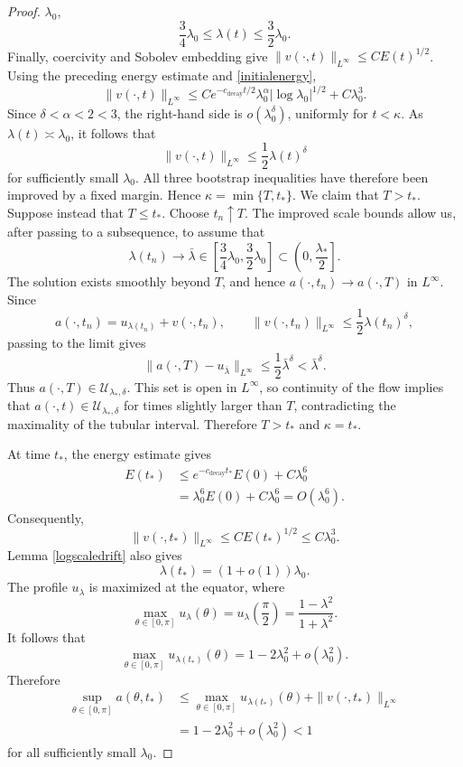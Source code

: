 \documentclass[11pt,a4paper]{article}
\numberwithin{equation}{section}
\theoremstyle{plain}
\theoremstyle{remark}
\begin{document}
\begin{proof}
$\lambda_0$,
$$
\frac34\lambda_0
\leq
\lambda(t)
\leq
\frac32\lambda_0.
$$
Finally, coercivity and Sobolev embedding give $\|v(\cdot,t)\|_{L^\infty}
\leq
CE(t)^{1/2}$. Using the preceding energy estimate and
\eqref{initialenergy},
$$
\|v(\cdot,t)\|_{L^\infty}
\leq
Ce^{-c_{\mathrm{decay}} t/2}
\lambda_0^\alpha
\left|\log\lambda_0\right|^{1/2}
+
C\lambda_0^3.
$$
Since $\delta<\alpha<2<3$, the right-hand side is
$o(\lambda_0^\delta)$, uniformly for $t<\kappa$. As
$\lambda(t)\asymp\lambda_0$, it follows that
$$
\|v(\cdot,t)\|_{L^\infty}
\leq
\frac12\lambda(t)^\delta
$$
for sufficiently small $\lambda_0$.
All three bootstrap inequalities have therefore been improved by a
fixed margin. Hence $\kappa=\min\{T,t_*\}$. We claim that $T>t_*$. Suppose instead that $T\leq t_*$. Choose
$t_n\uparrow T$. The improved scale bounds allow us, after passing
to a subsequence, to assume that
$$
\lambda(t_n)\longrightarrow\bar\lambda
\in
\left[\frac34\lambda_0,\frac32\lambda_0\right]
\subset
\left(0,\frac{\lambda_*}{2}\right].
$$
The solution exists smoothly beyond $T$, and hence
$a(\cdot,t_n)\to a(\cdot,T)$ in $L^\infty$. Since
$$
a(\cdot,t_n)
=
u_{\lambda(t_n)}+v(\cdot,t_n),
\qquad
\|v(\cdot,t_n)\|_{L^\infty}
\leq
\frac12\lambda(t_n)^\delta,
$$
passing to the limit gives
$$
\|a(\cdot,T)-u_{\bar\lambda}\|_{L^\infty}
\leq
\frac12\bar\lambda^\delta
<
\bar\lambda^\delta.
$$
Thus $a(\cdot,T)\in\mathcal U_{\lambda_*,\delta}$. This set is open
in $L^\infty$, so continuity of the flow implies that
$a(\cdot,t)\in\mathcal U_{\lambda_*,\delta}$ for times slightly
larger than $T$, contradicting the maximality of the tubular
interval. Therefore $T>t_*$ and $\kappa=t_*$.

At time $t_*$, the energy estimate gives
$$
\begin{aligned}
E(t_*)
&\leq
e^{-c_{\mathrm{decay}} t_*}E(0)+C\lambda_0^6\\
&=
\lambda_0^6E(0)+C\lambda_0^6
=
O(\lambda_0^6).
\end{aligned}
$$
Consequently,
$$
\|v(\cdot,t_*)\|_{L^\infty}
\leq
CE(t_*)^{1/2}
\leq
C\lambda_0^3.
$$ 
Lemma \ref{logscaledrift} also gives
$$
\lambda(t_*)=(1+o(1))\lambda_0.
$$
The profile $u_\lambda$ is maximized at the equator, where
$$
\max_{\theta\in[0,\pi]}u_\lambda(\theta)
=
u_\lambda\left(\frac{\pi}{2}\right)
=
\frac{1-\lambda^2}{1+\lambda^2}.
$$
It follows that
$$
\max_{\theta\in[0,\pi]}u_{\lambda(t_*)}(\theta)
=
1-2\lambda_0^2+o(\lambda_0^2).
$$
Therefore
$$
\begin{aligned}
\sup_{\theta\in[0,\pi]}a(\theta,t_*)
&\leq
\max_{\theta\in[0,\pi]}u_{\lambda(t_*)}(\theta)
+
\|v(\cdot,t_*)\|_{L^\infty}\\
&=
1-2\lambda_0^2+o(\lambda_0^2)
<
1
\end{aligned}
$$
for all sufficiently small $\lambda_0$.
\end{proof}
\end{document}

